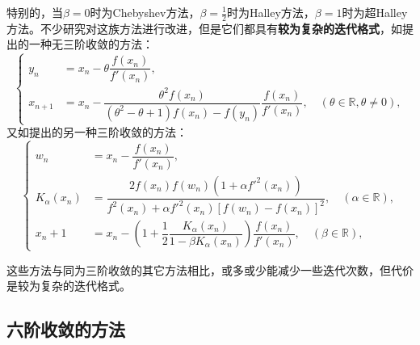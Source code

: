 特别的，当$\beta=0$时为Chebyshev方法，$\beta=\frac{1}{2}$时为Halley方法，$\beta=1$时为超Halley方法。不少研究对这族方法进行改进，但是它们都具有\textbf{较为复杂的迭代格式}，如\cite{kou2006modified}提出的一种无三阶收敛的方法：
\begin{equation}
    \begin{cases}
        y_n &= x_n - \theta\dfrac{f(x_n)}{f'(x_n)}, \\
        x_{n+1} &= x_n - \dfrac{\theta^2 f(x_n)}{(\theta^2 - \theta + 1)f(x_n) - f(y_n)}\dfrac{f(x_n)}{f'(x_n)},\quad (\theta \in \mathbb{R}, \theta \neq 0),
    \end{cases}
\end{equation}
又如\cite{chun2007some}提出的另一种三阶收敛的方法：
\begin{equation}
    \begin{cases}
        w_n & = x_n - \dfrac{f(x_n)}{f'(x_n)}, \\
        K_\alpha(x_n) & = \dfrac{2f(x_n)f(w_n)(1+\alpha f'^2(x_n))}{f^2(x_n)+\alpha f'^2(x_n)[f(w_n)-f(x_n)]^2}, \quad (\alpha \in \mathbb{R}), \\
        x_n+1 & = x_n - \left(1+\dfrac{1}{2}\dfrac{K_\alpha(x_n)}{1-\beta K_\alpha(x_n)}\right) \dfrac{f(x_n)}{f'(x_n)}, \quad (\beta \in \mathbb{R}),
    \end{cases}
\end{equation}


这些方法与同为三阶收敛的其它方法相比，或多或少能减少一些迭代次数，但代价是较为复杂的迭代格式。

\subsection{六阶收敛的方法}

